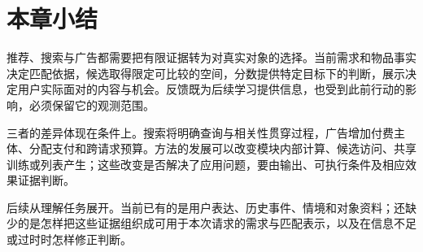 \section{本章小结}
\label{sec:rs-overview-summary}

推荐、搜索与广告都需要把有限证据转为对真实对象的选择。当前需求和物品事实决定匹配依据，候选取得限定可比较的空间，分数提供特定目标下的判断，展示决定用户实际面对的内容与机会。反馈既为后续学习提供信息，也受到此前行动的影响，必须保留它的观测范围。

三者的差异体现在条件上。搜索将明确查询与相关性贯穿过程，广告增加付费主体、分配支付和跨请求预算。方法的发展可以改变模块内部计算、候选访问、共享训练或列表产生；这些改变是否解决了应用问题，要由输出、可执行条件及相应效果证据判断。

后续从理解任务展开。当前已有的是用户表达、历史事件、情境和对象资料；还缺少的是怎样把这些证据组织成可用于本次请求的需求与匹配表示，以及在信息不足或过时时怎样修正判断。
